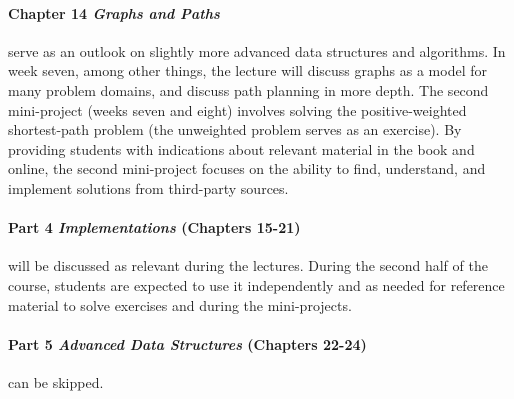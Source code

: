 \documentclass[a4paper,twoculumn,10pt]{article}
\begin{document}
\paragraph{Chapter 14 \emph{Graphs and Paths}} serve as an outlook on slightly more advanced data structures and algorithms.
In week seven, among other things, the lecture will discuss graphs as a model for many problem domains, and discuss path planning in more depth.
The second mini-project (weeks seven and eight) involves solving the positive-weighted shortest-path problem (the unweighted problem serves as an exercise).
By providing students with indications about relevant material in the book and online, the second mini-project focuses on the ability to find, understand, and implement solutions from third-party sources.

\paragraph{Part 4 \emph{Implementations} (Chapters 15-21)} will be discussed as relevant during the lectures.
During the second half of the course, students are expected to use it independently and as needed for reference material to solve exercises and during the mini-projects.

\paragraph{Part 5 \emph{Advanced Data Structures} (Chapters 22-24)} can be skipped.
\end{document}
